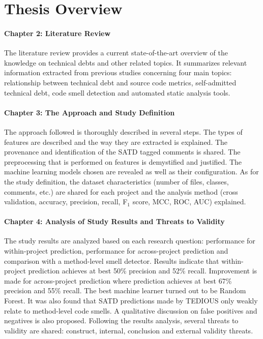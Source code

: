 \section{Thesis Overview}  


\paragraph{Chapter 2: Literature Review}
The literature review provides a current state-of-the-art overview of the knowledge on technical debts and other related topics. It summarizes relevant information extracted from previous studies concerning four main topics: relationship between technical debt and source code metrics, self-admitted technical debt, code smell detection and automated static analysis tools.

\paragraph{Chapter 3: The Approach and Study Definition}
The approach followed is thoroughly described in several steps. The types of features are described and the way they are extracted is explained. The provenance and identification of the \ac{SATD} tagged comments is shared. The preprocessing that is performed on features is demystified and justified. The machine learning models chosen are revealed as well as their configuration. As for the study definition, the dataset characteristics (number of files, classes, comments, etc.) are shared for each project and the analysis method (cross validation, accuracy, precision, recall, F$_{1}$ score, \ac{MCC}, \ac{ROC}, \ac{AUC}) explained.

\paragraph{Chapter 4: Analysis of Study Results and Threats to Validity}
The study results are analyzed based on each research question: performance for within-project prediction, performance for across-project prediction and comparison with a method-level smell detector. Results indicate that within-project prediction achieves at best 50\% precision and 52\% recall. Improvement is made for across-project prediction where prediction achieves at best 67\% precision and 55\% recall. The best machine learner turned out to be Random Forest. It was also found that \ac{SATD} predictions made by \ac{TEDIOUS} only weakly relate to method-level code smells. A qualitative discussion on false positives and negatives is also proposed. Following the results analysis, several threats to validity are shared: construct, internal, conclusion and external validity threats.


